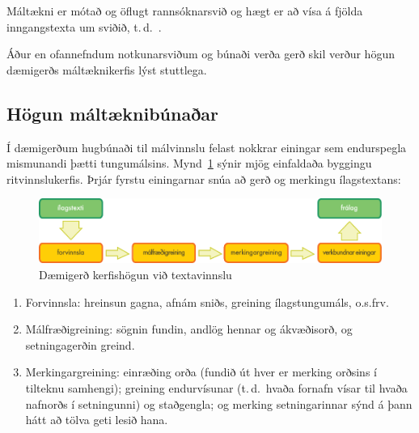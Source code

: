 \begin{multicols}{2}
Máltækni er mótað og öflugt rannsóknarsvið og hægt er að vísa á fjölda inngangstexta um sviðið, t.\,d.~\cite{carstensen-etal1, jurafsky-martin01, manning-schuetze1, lt-world1, lt-survey1}.

Áður en ofannefndum notkunarsviðum og búnaði verða gerð skil verður högun dæmigerðs máltæknikerfis lýst stuttlega.

\subsection{Högun máltæknibúnaðar}

Í dæmigerðum hugbúnaði til málvinnslu felast nokkrar einingar sem endurspegla mismunandi þætti tungumálsins. Mynd~\ref{fig:textprocessingarch_is} sýnir mjög einfaldaða byggingu ritvinnslukerfis. Þrjár fyrstu einingarnar snúa að gerð og merkingu ílagstextans: 

\begin{figure}[b]
  \center
  \includegraphics[width=\textwidth]{../_media/icelandic/text_processing_app_architecture}
  \caption{Dæmigerð kerfishögun við textavinnslu}
  \label{fig:textprocessingarch_is}
\end{figure}

\begin{enumerate}
\item Forvinnsla: hreinsun gagna, afnám sniðs, greining ílagstungumáls, o.s.frv.
\item Málfræðigreining: sögnin fundin, andlög hennar og ákvæðisorð, og setningagerðin greind.
\item Merkingargreining: einræðing orða (fundið út hver er merking orðsins í tilteknu samhengi); greining endurvísunar (t.\,d.~hvaða fornafn vísar til hvaða nafnorðs í setningunni) og staðgengla; og merking setningarinnar sýnd á þann hátt að tölva geti lesið hana.
\end{enumerate}


\end{multicols}
